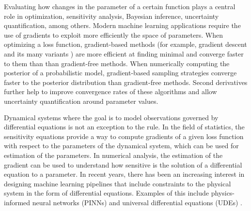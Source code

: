 Evaluating how changes in the parameter of a certain function plays a central role in optimization, sensitivity analysis, Bayesian inference, uncertainty quantification, among others. 
Modern machine learning applications require the use of gradients to exploit more efficiently the space of parameters. 
When optimizing a loss function, gradient-based methods (for example, gradient descent and its many variants \cite{ruder2016overview-gradient-descent}) are more efficient at finding minimal and converge faster to them than than gradient-free methods.
When numerically computing the posterior of a probabilistic model, gradient-based sampling strategies converge faster to the posterior distribution than gradient-free methods. 
Second derivatives further help to improve convergence rates of these algorithms and allow uncertainty quantification around parameter values. 

Dynamical systems where the goal is to model observations governed by differential equations is not an exception to the rule.
In the field of statistics, the sensitivity equations provide a way to compute gradients of a given loss function with respect to the parameters of the dynamical system, which can be used for estimation of the parameters. 
In numerical analysis, the estimation of the gradient can be used to understand how sensitive is the solution of a differential equation to a parameter. 
In recent years, there has been an increasing interest in designing machine learning pipelines that include constraints to the physical system in the form of differential equations. Examples of this include physics-informed neural networks (PINNs) \cite{PINNs_2019} and universal differential equations (UDEs) \cite{rackauckas2020universal}.  

